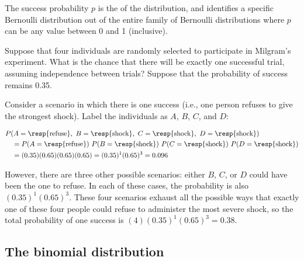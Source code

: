 The success probability $p$ is the  of the distribution, and identifies a specific Bernoulli distribution out of the entire family of Bernoulli distributions where $p$ can be any value between 0 and 1 (inclusive).  


\begin{example}{Suppose that four individuals are randomly selected to participate in Milgram's experiment. What is the chance that there will be exactly one successful trial, assuming independence between trials? Suppose that the probability of success remains 0.35.}\label{oneRefuser}
	
	Consider a scenario in which there is one success (i.e., one person refuses to give the strongest shock). Label the individuals as $A$, $B$, $C$, and $D$:
	
	\begin{align*}
	&P(A=\text{\resp{refuse}},\text{ }B=\text{\resp{shock}},\text{ }C=\text{\resp{shock}},\text{ }D=\text{\resp{shock}}) \\
	&\quad =  P(A=\text{\resp{refuse}})\ P(B=\text{\resp{shock}})\ P(C=\text{\resp{shock}})\ P(D=\text{\resp{shock}}) \\
	&\quad =  (0.35)  (0.65)  (0.65)  (0.65) = (0.35)^1 (0.65)^3 = 0.096
	\end{align*}
	
	However, there are three other possible scenarios: either $B$, $C$, or $D$ could have been the one to refuse. In each of these cases, the probability is also $(0.35)^1(0.65)^3$. These four scenarios exhaust all the possible ways that exactly one of these four people could refuse to administer the most severe shock, so the total probability of one success is $(4)(0.35)^1(0.65)^3 = 0.38$.
\end{example}


\subsection{The binomial distribution}


